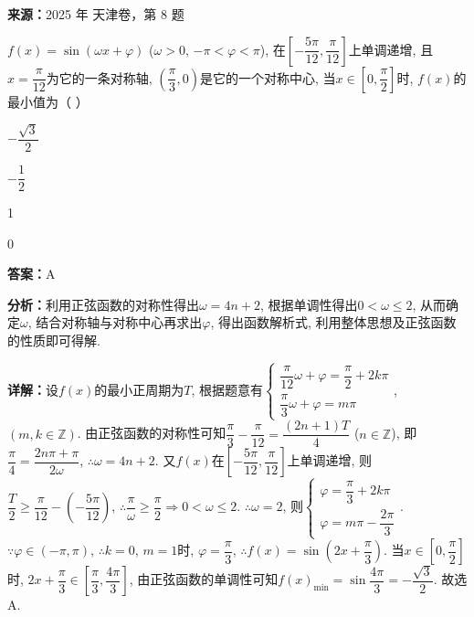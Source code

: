 \begin{question}[points=5]
\textbf{来源：}2025 年 天津卷，第 8 题\par
$f(x) = \sin(\omega x + \varphi)$ ($\omega > 0$, $-\pi < \varphi < \pi$), 在$\left[-\dfrac{5\pi}{12}, \dfrac{\pi}{12}\right]$上单调递增, 且$x = \dfrac{\pi}{12}$为它的一条对称轴, $\left(\dfrac{\pi}{3}, 0\right)$是它的一个对称中心, 当$x \in \left[0, \dfrac{\pi}{2}\right]$时, $f(x)$的最小值为（   ）
\begin{choices}
  \item $-\dfrac{\sqrt{3}}{2}$
  \item $-\dfrac{1}{2}$
  \item 1
  \item 0
\end{choices}
\begin{solution}
\textbf{答案：}A

\textbf{分析：}利用正弦函数的对称性得出$\omega = 4n + 2$, 根据单调性得出$0 < \omega \le 2$, 从而确定$\omega$, 结合对称轴与对称中心再求出$\varphi$, 得出函数解析式, 利用整体思想及正弦函数的性质即可得解.

\textbf{详解：}设$f(x)$的最小正周期为$T$, 根据题意有$\begin{cases} \dfrac{\pi}{12}\omega + \varphi = \dfrac{\pi}{2} + 2k\pi \\ \dfrac{\pi}{3}\omega + \varphi = m\pi \end{cases}$, $(m, k \in \mathbb{Z})$. 由正弦函数的对称性可知$\dfrac{\pi}{3} - \dfrac{\pi}{12} = \dfrac{(2n+1)T}{4}$ ($n \in \mathbb{Z}$), 即$\dfrac{\pi}{4} = \dfrac{2n\pi + \pi}{2\omega}$, $\therefore \omega = 4n + 2$. 又$f(x)$在$\left[-\dfrac{5\pi}{12}, \dfrac{\pi}{12}\right]$上单调递增, 则$\dfrac{T}{2} \ge \dfrac{\pi}{12} - \left(-\dfrac{5\pi}{12}\right)$, $\therefore \dfrac{\pi}{\omega} \ge \dfrac{\pi}{2} \Rightarrow 0 < \omega \le 2$. $\therefore \omega = 2$, 则$\begin{cases} \varphi = \dfrac{\pi}{3} + 2k\pi \\ \varphi = m\pi - \dfrac{2\pi}{3} \end{cases}$. $\because \varphi \in (-\pi, \pi)$, $\therefore k=0$, $m=1$时, $\varphi = \dfrac{\pi}{3}$, $\therefore f(x) = \sin\left(2x + \dfrac{\pi}{3}\right)$. 当$x \in \left[0, \dfrac{\pi}{2}\right]$时, $2x + \dfrac{\pi}{3} \in \left[\dfrac{\pi}{3}, \dfrac{4\pi}{3}\right]$, 由正弦函数的单调性可知$f(x)_{\min} = \sin\dfrac{4\pi}{3} = -\dfrac{\sqrt{3}}{2}$. 故选A.
\end{solution}
\end{question}

